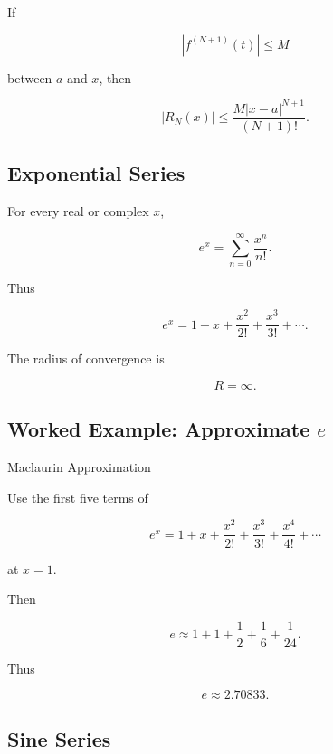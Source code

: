 If

\[
|f^{(N+1)}(t)|
\leq M
\]

between \(a\) and \(x\), then

\[
\boxed{
|R_N(x)|
\leq
\frac{
M|x-a|^{N+1}
}{
(N+1)!
}.
}
\]

\subsection{Exponential Series}
\label{subsec:exponential-series-reference}

For every real or complex \(x\),

\[
\boxed{
e^x
=
\sum_{n=0}^{\infty}
\frac{x^n}{n!}.
}
\]

Thus

\[
\boxed{
e^x
=
1+x+\frac{x^2}{2!}
+\frac{x^3}{3!}
+\cdots.
}
\]

The radius of convergence is

\[
\boxed{
R=\infty.
}
\]

\subsection{Worked Example: Approximate \(e\)}
\label{subsec:worked-approximate-e-series}

\begin{workedexamplebox}{Maclaurin Approximation}

Use the first five terms of

\[
e^x
=
1+x+\frac{x^2}{2!}
+\frac{x^3}{3!}
+\frac{x^4}{4!}
+\cdots
\]

at \(x=1\).

Then

\[
e
\approx
1+1+\frac12+\frac16+\frac1{24}.
\]

Thus

\begin{answerbox}
\[
\boxed{
e
\approx
2.70833.
}
\]
\end{answerbox}

\end{workedexamplebox}

\subsection{Sine Series}
\label{subsec:sine-series-reference}

